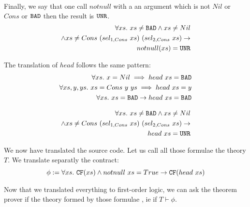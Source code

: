 \documentclass[preprint]{sigplanconf}
\begin{document}
Finally, we say that one call $notnull$ with a an argument which is
not $Nil$ or $Cons$ or $\texttt{BAD}$ then the result is $\texttt{UNR}$.
\begin{align}
  \label{unrnotnull}
  \forall xs.~xs \neq \texttt{BAD} \land xs \neq Nil  \notag \\
  \land xs \neq Cons~(sel_{1,Cons}~xs)~(sel_{2,Cons}~xs) \to  \notag \\
  notnull(xs) = \texttt{UNR} 
\end{align}

The translation of $head$ follows the same pattern:
\begin{align}
  \forall xs.~ x=Nil \implies head~xs = \texttt{BAD} \notag\\
  \forall xs,y,ys.~ xs=Cons~y~ys \implies head~xs = y     \label{defhead} \\
    \forall xs.~xs=\texttt{BAD} \to head~xs = \texttt{BAD} \notag
\end{align}

\begin{align*}
 \forall xs.~xs \neq \texttt{BAD} \land xs \neq Nil \notag \\
 \land xs \neq Cons~(sel_{1,Cons}~xs)~(sel_{2,Cons}~xs) \to  \notag \\
 head~xs = \texttt{UNR}
\end{align*}

We now have translated the source code. Let us call all those formulae
the theory $T$. We translate separatly the contract:
\begin{equation*}
  \phi := \forall xs.~\texttt{CF}(xs) \land notnull~xs = True \to \texttt{CF}(head~xs) 
\end{equation*}

Now that we translated everything to first-order logic, we can ask the
theorem prover if the theory formed by those formulae , ie if $T \vdash \phi$.
\end{document}
